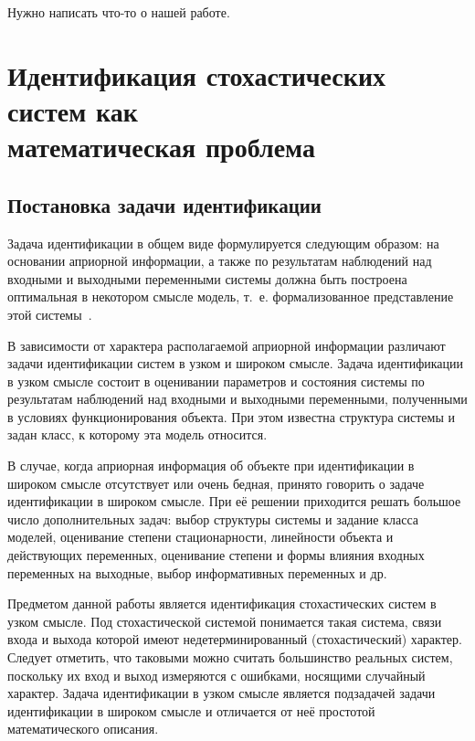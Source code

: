 {\color{red}
  Нужно написать что-то о нашей работе.
}

\section[Идентификация стохастических систем как математическая проблема]{%
  Идентификация стохастических систем как \\
  математическая проблема}

\subsection{Постановка задачи идентификации}

Задача идентификации в общем виде формулируется следующим образом:
на основании априорной информации, а также по результатам наблюдений над
входными и выходными переменными системы должна быть построена оптимальная в
некотором смысле модель, т.~е. формализованное представление этой системы~\cite{eikhoff_1975}.

В зависимости от характера располагаемой априорной информации различают
задачи идентификации систем в узком и широком смысле.
Задача идентификации в узком смысле состоит в оценивании параметров и
состояния системы по результатам наблюдений над входными и выходными переменными,
полученными в условиях функционирования объекта.
При этом известна структура системы и задан класс, к которому эта модель относится.

В случае, когда априорная информация об объекте при идентификации в широком смысле отсутствует
или очень бедная, принято говорить о задаче идентификации в широком смысле.
При её решении приходится решать большое число дополнительных задач:
выбор структуры системы и задание класса моделей,
оценивание степени стационарности, линейности объекта и действующих переменных,
оценивание степени и формы влияния входных переменных на выходные,
выбор информативных переменных и др.

Предметом данной работы является идентификация стохастических систем в узком смысле.
Под стохастической системой понимается такая система, связи входа и выхода которой имеют
недетерминированный (стохастический) характер.
Следует отметить, что таковыми можно считать большинство реальных систем,
поскольку их вход и выход измеряются с ошибками, носящими случайный характер.
Задача идентификации в узком смысле является подзадачей задачи идентификации в широком смысле
и отличается от неё простотой математического описания.

